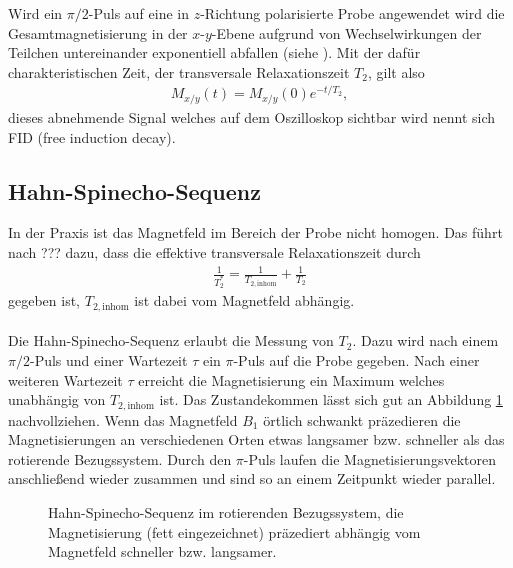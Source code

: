 Wird ein $\pi/2$-Puls auf eine in $z$-Richtung polarisierte Probe angewendet wird die Gesamtmagnetisierung in der $x$-$y$-Ebene aufgrund von Wechselwirkungen der Teilchen untereinander exponentiell abfallen (siehe \cite{manual}). Mit der dafür charakteristischen Zeit, der transversale Relaxationszeit $T_2$, gilt also
\begin{align}
  M_{x/y}(t)=M_{x/y}(0) e^{-t/T_2},
\end{align}
dieses abnehmende Signal welches auf dem Oszilloskop sichtbar wird nennt sich FID (free induction decay).

\subsection{Hahn-Spinecho-Sequenz}
In der Praxis ist das Magnetfeld im Bereich der Probe nicht homogen. Das führt nach ??? dazu, dass die effektive transversale Relaxationszeit durch
\begin{align*}
  \frac{1}{T_2^*}=\frac{1}{T_{2,\mathrm{inhom}}}+\frac{1}{T_2}
\end{align*}
gegeben ist, $T_{2,\mathrm{inhom}}$ ist dabei vom Magnetfeld abhängig. \\ \\
Die Hahn-Spinecho-Sequenz erlaubt die Messung von $T_2$. Dazu wird nach einem $\pi/2$-Puls und einer Wartezeit $\tau$ ein $\pi$-Puls auf die Probe gegeben. Nach einer weiteren Wartezeit $\tau$ erreicht die Magnetisierung ein Maximum welches unabhängig von $T_{2,\mathrm{inhom}}$ ist. Das Zustandekommen lässt sich gut an Abbildung \ref{hahn} nachvollziehen. Wenn das Magnetfeld $B_1$ örtlich schwankt präzedieren die Magnetisierungen an verschiedenen Orten etwas langsamer bzw. schneller als das rotierende Bezugssystem. Durch den $\pi$-Puls laufen die Magnetisierungsvektoren anschließend wieder zusammen und sind so an einem Zeitpunkt wieder parallel. 

\begin{figure}[h]
  \centering
  \caption{Hahn-Spinecho-Sequenz im rotierenden Bezugssystem, die Magnetisierung (fett eingezeichnet) präzediert abhängig vom Magnetfeld schneller bzw. langsamer.}
  \label{hahn}
\end{figure}

